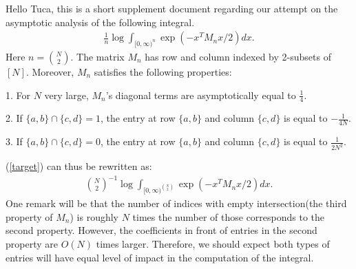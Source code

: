 \documentclass[10pt]{article}
\author{Yi Gu}
\newenvironment{Proof of lemma}{\noindent{\bf Proof of Lemma}}{\hfill$\Box$\newline}
\newenvironment{Proof of claim}{\noindent{\bf Proof of claim}}{\hfill$\Box$\newline}
\newenvironment{Proof of theorem}{\noindent{\bf Proof of Theorem}}{\hfill\scriptsize{$\Box$}\newline}
\newenvironment{Proof of theorems}{\noindent{\bf Proof of Theorems}}{\hfill$\Box$\newline}
\newenvironment{Proof of proposition}{\noindent{\bf Proof of Proposition}}{\hfill$\Box$\newline}
\newenvironment{Proof of propositions}{\noindent{\bf Proof of Propositions}}{\hfill$\Box$\newline}
\newenvironment{Proof of exercise}{\noindent{\it Proof of Exercise:}}{\hfill$\Box$}
\begin{document}
Hello Tuca, this is a short supplement document regarding our attempt on the asymptotic analysis of the following integral.
\begin{align} \label{target}
    \frac{1}{n}\log \int_{[0,\infty)^n} \exp \left(-x^T M_n x/2\right)dx.
\end{align}
Here $n = \binom{N}{2}$. The matrix $M_n$ has row and column indexed by 2-subsets of $[N]$. Moreover, $M_n$ satisfies the following properties:

1. For $N$ very large, $M_n$'s diagonal terms are asymptotically equal to $\frac{1}{4}$.

2. If $\{a,b\} \cap \{c,d\} = 1$, the entry at row $\{a,b\}$ and column $\{c,d\}$ is equal to $-\frac{1}{4N}$.

3. If $\{a,b\} \cap \{c,d\} = 0$, the entry at row $\{a,b\}$ and column $\{c,d\}$ is equal to $\frac{1}{2N^2}$.

(\ref{target}) can thus be rewritten as:
\begin{align}
    \binom{N}{2}^{-1}\log \int_{[0,\infty)^{\binom{N}{2}}} \exp \left(-x^T M_n x/2\right)dx.
\end{align}
One remark will be that the number of indices with empty intersection(the third property of $M_n$) is roughly $N$ times the number of those corresponds to the second property. However, the coefficients in front of entries in the second property are $O(N)$ times larger. Therefore, we should expect both types of entries will have equal level of impact in the computation of the integral.
\end{document}
